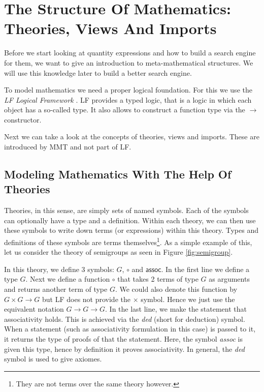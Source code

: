 \section{The Structure Of Mathematics: Theories, Views And Imports}
\label{sec:mathoverview}

Before we start looking at quantity expressions and how to build a search engine for them, we want to give an introduction to meta-mathematical structures. We will use this knowledge later to build a better search engine.

To model mathematics we need a proper logical foundation. For this we use the \textit{LF Logical Framework} \cite{hhp93lf}. LF provides a typed logic, that is a logic in which each object has a so-called type. It also allows to construct a function type via the $\rightarrow$ constructor.

Next we can take a look at the concepts of theories, views and imports. These are introduced by MMT and not part of LF.

\subsection{Modeling Mathematics With The Help Of Theories}

Theories, in this sense, are simply sets of named symbols. Each of the symbols can optionally have a type and a definition. Within each theory, we can then use these symbols to write down terms (or expressions) within this theory. Types and definitions of these symbols are terms themselves\footnote{They are not terms over the same theory however. }. As a simple example of this, let us consider the theory of semigroups as seen in Figure \ref{fig:semigroup}.



In this theory, we define 3 symbols: $G$, $\circ$ and $\scriptstyle \mathsf{assoc}$. In the first line we define a type $G$. Next we define a function $\circ$ that takes 2 terms of type $G$ as arguments and returns another term of type $G$. We could also denote this function by $G \times G \rightarrow G$ but LF does not provide the $\times$ symbol. Hence we just use the equivalent notation $G \rightarrow G \rightarrow G$. In the last line, we make the statement that associativity holds. This is achieved via the \textit{ded} (short for deduction) symbol. When a statement (such as associativity formulation in this case) is passed to it, it returns the type of proofs of that the statement. Here, the symbol \textit{assoc} is given this type, hence by definition it proves associativity. In general, the \textit{ded} symbol is used to give axiomes.

